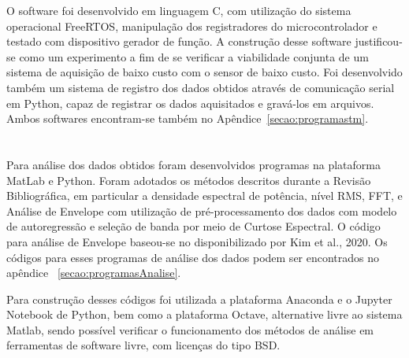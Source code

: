 \documentclass[
	12pt,				
	oneside,			
	a4paper,			
	english,			
	brazil,			
	]{abntex2ppgsi}
\begin{document}
O software foi desenvolvido em linguagem C, com utilização do sistema operacional FreeRTOS, manipulação dos registradores do microcontrolador e testado com dispositivo gerador de função. A construção desse software justificou-se como um experimento a fim de se verificar a viabilidade conjunta de um sistema de aquisição de baixo custo com o sensor de baixo custo. Foi desenvolvido também um sistema de registro dos dados obtidos através de comunicação serial em Python, capaz de registrar os dados aquisitados e gravá-los em arquivos. Ambos softwares encontram-se também no Apêndice~\ref{secao:programastm}.



\section{}

Para análise dos dados obtidos foram desenvolvidos programas na plataforma MatLab e Python. Foram adotados os métodos descritos durante a Revisão Bibliográfica, em particular a densidade espectral de potência, nível RMS, FFT, e Análise de Envelope com utilização de pré-processamento dos dados com modelo de autoregressão e seleção de banda por meio de Curtose Espectral. O código para análise de Envelope baseou-se no disponibilizado por Kim et al., 2020. Os códigos para esses programas de análise dos dados podem ser encontrados no apêndice ~\ref{secao:programasAnalise}.

Para construção desses códigos foi utilizada a plataforma Anaconda e o Jupyter Notebook de Python, bem como a plataforma Octave, alternative livre ao sistema Matlab, sendo possível verificar o funcionamento dos métodos de análise em ferramentas de software livre, com licenças do tipo BSD. 

\section{}
\end{document}

